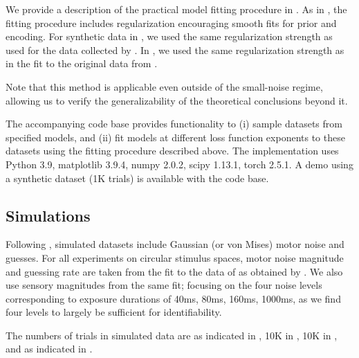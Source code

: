 We provide a description of the practical model fitting procedure in . As in \cite{hahn2024unifying}, the fitting procedure includes regularization encouraging smooth fits for prior and encoding.
For synthetic data in , we used the same regularization strength as \cite{hahn2024unifying} used for the data collected by \cite{deGardelle2010AnOI}.
In , we used the same regularization strength as in the fit to the original data from \cite{hahn2024unifying}.


Note that this method is applicable even outside of the small-noise regime, allowing us to verify the generalizability of the theoretical conclusions beyond it.



The accompanying code base provides functionality to (i) sample datasets from specified models, and (ii) fit models at different loss function exponents to these datasets using the fitting procedure described above.
The implementation uses Python 3.9, matplotlib 3.9.4, numpy 2.0.2, scipy 1.13.1, torch 2.5.1.
A demo using a synthetic dataset (1K trials) is available with the code base.



\subsection*{Simulations}
Following \cite{hahn2024unifying}, simulated datasets include Gaussian (or von Mises) motor noise and guesses. For all experiments on circular stimulus spaces, motor noise magnitude and guessing rate are taken from the fit to the data of \cite{deGardelle2010AnOI} as obtained by \cite{hahn2024unifying}. We also use sensory magnitudes from the same fit; focusing on the four noise levels corresponding to exposure durations of 40ms, 80ms, 160ms, 1000ms, as we find four levels to largely be sufficient for identifiability.
%

%

%
%
The numbers of trials in simulated data are as indicated in , 10K in , 10K in , and as indicated in .

